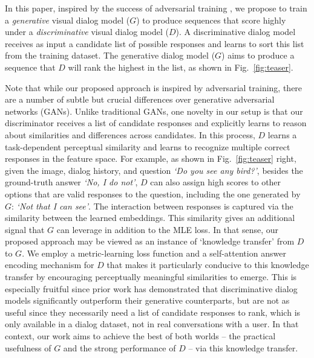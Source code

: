 \documentclass{article}
\newcommand{\myquote}[1]{\emph{`#1'}}
\begin{document}
In this paper, inspired by the success of adversarial training \cite{goodfellow2014generative}, we propose to train a \emph{generative} visual dialog model ($G$) to produce sequences that score highly under a \emph{discriminative} visual dialog model ($D$). A discriminative dialog model receives as input a candidate list of possible responses and learns to sort this list from the training dataset. The generative dialog model ($G$) aims to produce a sequence that $D$ will rank the highest in the list, as shown in Fig.~\ref{fig:teaser}.

Note that while our proposed approach is inspired by adversarial training, there are a number of subtle but crucial differences over generative adversarial networks (GANs). 
Unlike traditional GANs, one novelty in our setup is that our discriminator receives a list of candidate responses and explicitly learns to 
reason about similarities and differences across candidates.
In this process, 
$D$ learns a task-dependent perceptual similarity \cite{dosovitskiy2016generating, johnson2016perceptual, gatys2015neural} and learns to recognize 
multiple correct responses in the feature space. For example, as shown in  Fig.~\ref{fig:teaser} right, given the image, dialog history, and question 
\myquote{Do you see any bird?}, besides the ground-truth answer \myquote{No, I do not}, $D$ can also assign high scores to other options that are 
valid responses to the question, including the one generated by $G$: \myquote{Not that I can see}. 
The interaction between responses is captured via the similarity between the learned embeddings. This similarity gives an additional signal that $G$ can leverage in addition to the MLE loss.
In that sense, our proposed approach may be viewed as an instance of `knowledge transfer' \cite{hinton2015distilling, chen2015net2net} from $D$ to $G$. 
We employ a metric-learning loss function and a self-attention answer encoding mechanism for $D$ that makes 
it particularly conducive to this knowledge transfer 
by encouraging perceptually meaningful similarities to emerge. 
This is especially fruitful since prior work has demonstrated that discriminative dialog models significantly 
outperform their generative counterparts, but are not as useful since they necessarily need a list of candidate responses to rank, 
which is only available in a dialog dataset, not in real conversations with a user. In that context, our work aims to 
achieve the best of both worlds -- the practical usefulness of $G$ and the strong performance of $D$ -- via this knowledge transfer. 
\end{document}
